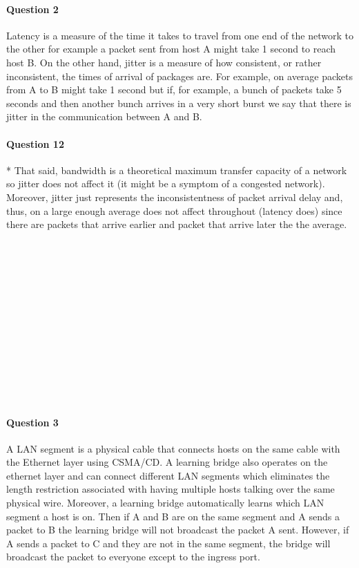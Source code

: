\documentclass[12pt]{article}
\begin{document}
\paragraph*{Question 2}
Latency is a measure of the time it takes to travel from one end of the network to the other for
example a packet sent from host A might take 1 second to reach host B. On the other hand, jitter is
a measure of how consistent, or rather inconsistent, the times of arrival of packages are. For
example, on average packets from A to B might take 1 second but if, for example, a bunch of packets
take 5 seconds and then another bunch arrives in a very short burst we say that there is jitter
in the communication between A and B.

\paragraph*{Question 12}*{}
That said, bandwidth is a theoretical maximum transfer capacity of a network so jitter does not
affect it (it might be a symptom of a congested network). Moreover, jitter just represents the
inconsistentness of packet arrival delay and, thus, on a large  enough average does not affect
throughout (latency does) since there are packets that arrive earlier and packet that arrive later
the the average.

\pagebreak

\begin{verbatim}
    














\end{verbatim}

\paragraph*{Question 3}
A LAN segment is a physical cable that connects hosts on the same cable with the Ethernet layer
using CSMA/CD. A learning bridge also operates on the ethernet layer and can connect different
LAN segments which eliminates the length restriction associated with having multiple hosts talking
over the same physical wire. Moreover, a learning bridge automatically learns which LAN segment a
host is on. Then if A and B are on the same segment and A sends a packet to B the learning bridge
will not broadcast the packet A sent. However, if A sends a packet to C and they are not in the
same segment, the bridge will broadcast the packet to everyone except to the ingress port.
\end{document}
